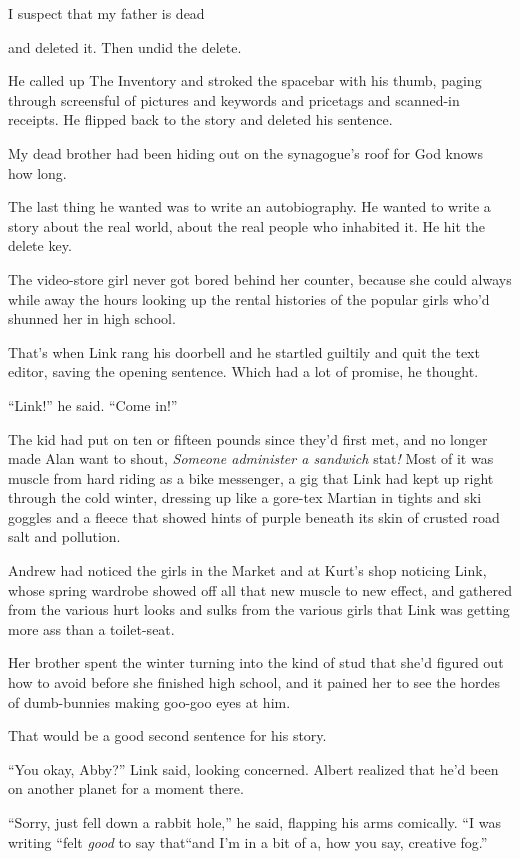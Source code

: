I suspect that my father is dead

and deleted it.  Then undid the delete.

He called up The Inventory and stroked the spacebar with his thumb,
paging through screensful of pictures and keywords and pricetags and
scanned-in receipts.  He flipped back to the story and deleted his
sentence.

My dead brother had been hiding out on the synagogue's roof for God
knows how long.

The last thing he wanted was to write an autobiography.  He wanted to
write a story about the real world, about the real people who
inhabited it.  He hit the delete key.

The video-store girl never got bored behind her counter, because she
could always while away the hours looking up the rental histories of
the popular girls who'd shunned her in high school.

That's when Link rang his doorbell and he startled guiltily and quit
the text editor, saving the opening sentence.  Which had a lot of
promise, he thought.

``Link!'' he said.  ``Come in!''

The kid had put on ten or fifteen pounds since they'd first met, and
no longer made Alan want to shout, \textit{Someone administer a
sandwich} stat\textit{!} Most of it was muscle from hard riding as a
bike messenger, a gig that Link had kept up right through the cold
winter, dressing up like a gore-tex Martian in tights and ski goggles
and a fleece that showed hints of purple beneath its skin of crusted
road salt and pollution.

Andrew had noticed the girls in the Market and at Kurt's shop noticing
Link, whose spring wardrobe showed off all that new muscle to new
effect, and gathered from the various hurt looks and sulks from the
various girls that Link was getting more ass than a toilet-seat.

Her brother spent the winter turning into the kind of stud that she'd
figured out how to avoid before she finished high school, and it
pained her to see the hordes of dumb-bunnies making goo-goo eyes at
him.

That would be a good second sentence for his story.

``You okay, Abby?'' Link said, looking concerned.  Albert realized
that he'd been on another planet for a moment there.

``Sorry, just fell down a rabbit hole,'' he said, flapping his arms
comically.  ``I was writing ``\dash{}felt \textit{good} to say that\dash{}``and
I'm in a bit of a, how you say, creative fog.''

